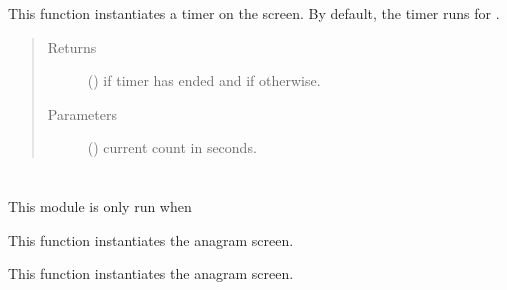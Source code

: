 \documentclass[letterpaper,10pt,english,openany,oneside]{sphinxmanual}
\begin{document}

\begin{fulllineitems}
\label{\detokenize{index:interface.timer}}
This function instantiates a timer on the screen. By default, the timer runs for .
\begin{quote}\begin{description}
\item[{Returns}] \leavevmode
()  if timer has ended and  if otherwise.

\item[{Parameters}] \leavevmode
{} () \textendash{} current count in seconds.

\end{description}\end{quote}

\end{fulllineitems}



\section{}
\label{\detokenize{index:module-cli_interface}}\label{\detokenize{index:cli-interface-py}}
This module is only run when 

\begin{fulllineitems}
\label{\detokenize{index:cli_interface.anagram_screen}}
This function instantiates the anagram screen.

\end{fulllineitems}


\begin{fulllineitems}
\label{\detokenize{index:cli_interface.combine_screen}}
This function instantiates the anagram screen.

\end{fulllineitems}
\end{document}
